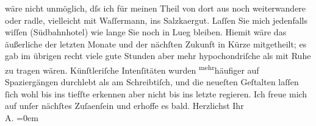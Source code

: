 \begin{ledgroupsized}[t]{13cm}
               wäre nicht unmöglich, dſs ich für meinen Theil von dort aus noch weiterwandere oder
               radle, vielleicht mit Waſſermann, ins Salzka{\geminationm}ergut. Laſſen Sie
               mich jedenfalls wiſſen (Südbahnhotel) wie lange Sie
               noch in Lueg bleiben. Hiemit wäre das äußerliche der
               letzten Monate und der nächſten Zukunft in Kürze mitgetheilt; es gab im übrigen recht
               viele gute Stunden aber mehr hypochondriſche als mit Ruhe zu tragen wären.
               Künſtleriſche Intenſitäten wurden \substVorne{}\textsuperscript{mehr}\substDazwischen{}häufiger\substHinten{} auf Spaziergängen durchlebt als am Schreibtiſch, und die neueſten Geſtalten
               laſſen ſich wohl bis ins tiefſte erkennen aber nicht bis ins letzte regieren. Ich
               freue mich auf unſer nächſtes Zuſa{\geminationm}enſein und erhoffe es
               bald.\pend
           \pstart
           Herzlichst Ihr{\\[\baselineskip]}\spacefill\mbox{A.}\pend
           \leftskip=0em{}\endnumbering{}\end{ledgroupsized}  \newcommand{\dateiname}{L01625}\newcommand{\titel}{Arthur Schnitzler an Hugo von Hofmannsthal, 8. 9. 1906}\newcommand{\editorInnen}{Martin Anton Müller und Gerd-Hermann Susen}
            \footnotesize
\begin{ledgroupsized}[t]{11.5cm}
\end{ledgroupsized}
         
      